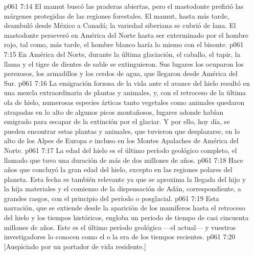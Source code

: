 \vs p061 7:14 El mamut buscó las praderas abiertas, pero el mastodonte prefirió las márgenes protegidas de las regiones forestales. El mamut, hasta más tarde, deambuló desde México a Canadá; la variedad siberiana se cubrió de lana. El mastodonte perseveró en América del Norte hasta ser exterminado por el hombre rojo, tal como, más tarde, el hombre blanco haría lo mismo con el bisonte.
\vs p061 7:15 En América del Norte, durante la última glaciación, el caballo, el tapir, la llama y el tigre de dientes de sable se extinguieron. Sus lugares los ocuparon los perezosos, los armadillos y los cerdos de agua, que llegaron desde América del Sur.
\vs p061 7:16 La emigración forzosa de la vida ante el avance del hielo resultó en una mezcla extraordinaria de plantas y animales, y, con el retroceso de la última ola de hielo, numerosas especies árticas tanto vegetales como animales quedaron atrapadas en lo alto de algunos picos montañosos, lugares adonde habían emigrado para escapar de la extinción por el glaciar. Y por ello, hoy día, se pueden encontrar estas plantas y animales, que tuvieron que desplazarse, en lo alto de los Alpes de Europa e incluso en los Montes Apalaches de América del Norte.
\vs p061 7:17 \pc La edad del hielo es el último período geológico completo, el llamado  que tuvo una duración de más de dos millones de años.
\vs p061 7:18 \pc Hace  años que concluyó la gran edad del hielo, excepto en las regiones polares del planeta. Esta fecha es también relevante ya que se aproxima la llegada del hijo y la hija materiales y el comienzo de la dispensación de Adán, correspondiente, a grandes rasgos, con el principio del período  o posglacial.
\vs p061 7:19 \pc Esta narración, que se extiende desde la aparición de los mamíferos hasta el retroceso del hielo y los tiempos históricos, engloba un periodo de tiempo de casi cincuenta millones de años. Este es el último período geológico ---el actual--- y vuestros investigadores lo conocen como el  o la era de los tiempos recientes.
\vsetoff
\vs p061 7:20 [Auspiciado por un portador de vida residente.]
